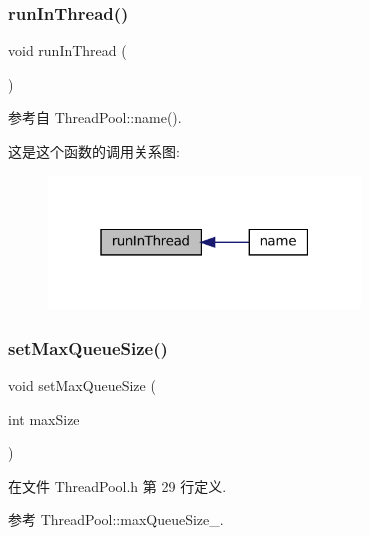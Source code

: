 \subsubsection{\texorpdfstring{run\+In\+Thread()}{runInThread()}}
{\footnotesize\ttfamily void run\+In\+Thread (\begin{DoxyParamCaption}{ }\end{DoxyParamCaption})\hspace{0.3cm}{\ttfamily [private]}}



参考自 Thread\+Pool\+::name().

这是这个函数的调用关系图\+:
\nopagebreak
\begin{figure}[H]
\begin{center}
\leavevmode
\includegraphics[width=235pt]{classmuduo_1_1ThreadPool_aa749f15d9283ccb246c7d458e2eea2d5_icgraph}
\end{center}
\end{figure}
\mbox{\label{classmuduo_1_1ThreadPool_a56a75ef71bd9fd9c5a42942cf327a0a6}} 
\subsubsection{\texorpdfstring{set\+Max\+Queue\+Size()}{setMaxQueueSize()}}
{\footnotesize\ttfamily void set\+Max\+Queue\+Size (\begin{DoxyParamCaption}\item[{int}]{max\+Size }\end{DoxyParamCaption})\hspace{0.3cm}{\ttfamily [inline]}}



在文件 Thread\+Pool.\+h 第 29 行定义.



参考 Thread\+Pool\+::max\+Queue\+Size\+\_\+.

\mbox{\label{classmuduo_1_1ThreadPool_a4e2a4c84ffbb1dddd012ee464aa75007}} 
